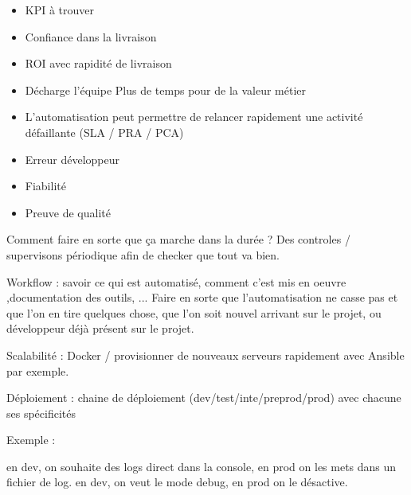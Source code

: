 
\begin{itemize}
	\item KPI à trouver
	\item Confiance dans la livraison
	\item ROI avec rapidité de livraison
	\item Décharge l'équipe
	\subitem Plus de temps pour de la valeur métier
	\item L'automatisation peut permettre de relancer rapidement une activité défaillante (SLA / PRA / PCA)
\end{itemize}

\begin{itemize}
	\item Erreur développeur
	\item Fiabilité
	\item Preuve de qualité
\end{itemize}


Comment faire en sorte que ça marche dans la durée ? Des controles / supervisons périodique afin de checker que tout va bien.


Workflow : savoir ce qui est automatisé, comment c'est mis en oeuvre ,documentation des outils, ...
Faire en sorte que l'automatisation ne casse pas et que l'on en tire quelques chose, que l'on soit nouvel arrivant sur le projet, ou développeur déjà présent sur le projet.



Scalabilité : Docker / provisionner de nouveaux serveurs rapidement avec Ansible par exemple.

Déploiement : chaine de déploiement (dev/test/inte/preprod/prod) avec chacune ses spécificités

Exemple :

en dev, on souhaite des logs direct dans la console, en prod on les mets dans un fichier de log.
en dev, on veut le mode debug, en prod on le désactive.

